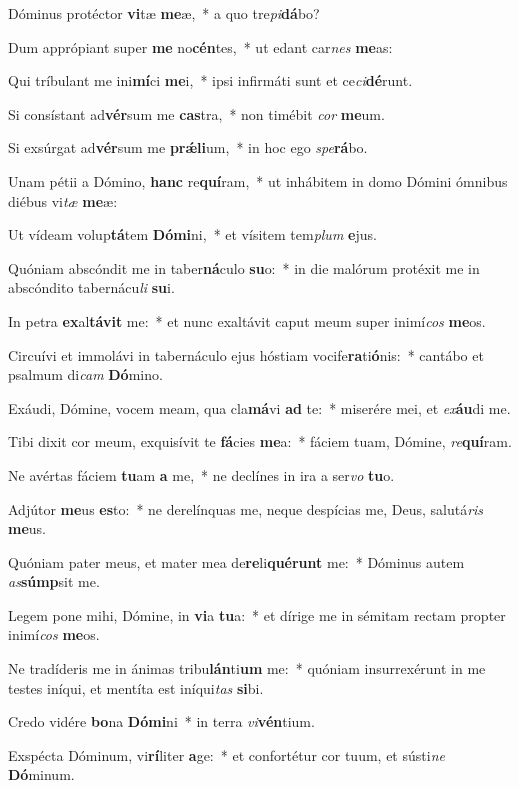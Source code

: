 \item Dóminus protéctor \textbf{vi}tæ \textbf{me}æ,~* a quo tre\textit{pi}\textbf{dá}bo?
\item Dum apprópiant super \textbf{me} no\textbf{cén}tes,~* ut edant car\textit{nes} \textbf{me}as:
\item Qui tríbulant me ini\textbf{mí}ci \textbf{me}i,~* ipsi infirmáti sunt et ce\textit{ci}\textbf{dé}runt.
\item Si consístant ad\textbf{vér}sum me \textbf{cas}tra,~* non timébit \textit{cor} \textbf{me}um.
\item Si exsúrgat ad\textbf{vér}sum me \textbf{prǽ}\textbf{li}um,~* in hoc ego \textit{spe}\textbf{rá}bo.
\item Unam pétii a Dómino, \textbf{hanc} re\textbf{quí}ram,~* ut inhábitem in domo Dómini ómnibus diébus vi\textit{tæ} \textbf{me}æ:
\item Ut vídeam volup\textbf{tá}tem \textbf{Dó}\textbf{mi}ni,~* et vísitem tem\textit{plum} \textbf{e}jus.
\item Quóniam abscóndit me in taber\textbf{ná}culo \textbf{su}o:~* in die malórum protéxit me in abscóndito tabernácu\textit{li} \textbf{su}i.
\item In petra \textbf{ex}al\textbf{tá}\textbf{vit} me:~* et nunc exaltávit caput meum super inimí\textit{cos} \textbf{me}os.
\item Circuívi et immolávi in tabernáculo ejus hóstiam vocife\textbf{ra}ti\textbf{ó}nis:~* cantábo et psalmum di\textit{cam} \textbf{Dó}mino.
\item Exáudi, Dómine, vocem meam, qua cla\textbf{má}vi \textbf{ad} te:~* miserére mei, et \textit{ex}\textbf{áu}di me.
\item Tibi dixit cor meum, exquisívit te \textbf{fá}cies \textbf{me}a:~* fáciem tuam, Dómine, \textit{re}\textbf{quí}ram.
\item Ne avértas fáciem \textbf{tu}am \textbf{a} me,~* ne declínes in ira a ser\textit{vo} \textbf{tu}o.
\item Adjútor \textbf{me}us \textbf{es}to:~* ne derelínquas me, neque despícias me, Deus, salutá\textit{ris} \textbf{me}us.
\item Quóniam pater meus, et mater mea de\textbf{re}li\textbf{qué}\textbf{runt} me:~* Dóminus autem \textit{as}\textbf{súmp}sit me.
\item Legem pone mihi, Dómine, in \textbf{vi}a \textbf{tu}a:~* et dírige me in sémitam rectam propter inimí\textit{cos} \textbf{me}os.
\item Ne tradíderis me in ánimas tribu\textbf{lán}ti\textbf{um} me:~* quóniam insurrexérunt in me testes iníqui, et mentíta est iníqui\textit{tas} \textbf{si}bi.
\item Credo vidére \textbf{bo}na \textbf{Dó}\textbf{mi}ni~* in terra \textit{vi}\textbf{vén}tium.
\item Exspécta Dóminum, vi\textbf{rí}liter \textbf{a}ge:~* et confortétur cor tuum, et sústi\textit{ne} \textbf{Dó}minum.
